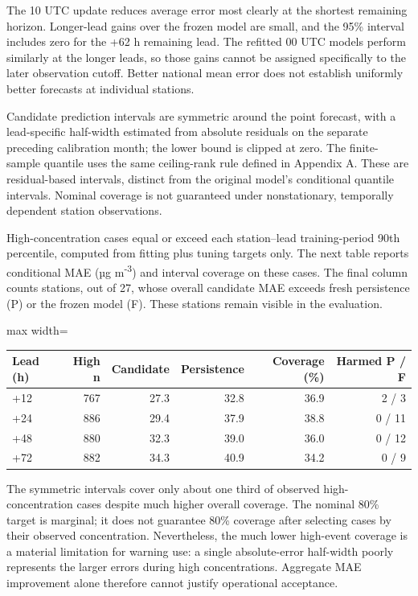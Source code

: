 \documentclass[11pt,a4paper]{article}
\begin{document}
The 10 UTC update reduces average error most clearly at the shortest remaining horizon. Longer-lead gains over the frozen model are small, and the 95\% interval includes zero for the +62 h remaining lead. The refitted 00 UTC models perform similarly at the longer leads, so those gains cannot be assigned specifically to the later observation cutoff. Better national mean error does not establish uniformly better forecasts at individual stations.

Candidate prediction intervals are symmetric around the point forecast, with a lead-specific half-width estimated from absolute residuals on the separate preceding calibration month; the lower bound is clipped at zero. The finite-sample quantile uses the same ceiling-rank rule defined in Appendix A. These are residual-based intervals, distinct from the original model's conditional quantile intervals. Nominal coverage is not guaranteed under nonstationary, temporally dependent station observations.

High-concentration cases equal or exceed each station–lead training-period 90th percentile, computed from fitting plus tuning targets only. The next table reports conditional MAE (µg m\textsuperscript{-3}) and interval coverage on these cases. The final column counts stations, out of 27, whose overall candidate MAE exceeds fresh persistence (P) or the frozen model (F). These stations remain visible in the evaluation.

\begin{table}[H]
\centering
\small
\begin{adjustbox}{max width=\linewidth}
\begin{tabular}{lrrrrr}
\toprule
Lead (h) & High n & Candidate & Persistence & Coverage (\%) & Harmed P / F \\
\midrule
+12 & 767 & 27.3 & 32.8 & 36.9 & 2 / 3 \\
+24 & 886 & 29.4 & 37.9 & 38.8 & 0 / 11 \\
+48 & 880 & 32.3 & 39.0 & 36.0 & 0 / 12 \\
+72 & 882 & 34.3 & 40.9 & 34.2 & 0 / 9 \\
\bottomrule
\end{tabular}
\end{adjustbox}
\end{table}

The symmetric intervals cover only about one third of observed high-concentration cases despite much higher overall coverage. The nominal 80\% target is marginal; it does not guarantee 80\% coverage after selecting cases by their observed concentration. Nevertheless, the much lower high-event coverage is a material limitation for warning use: a single absolute-error half-width poorly represents the larger errors during high concentrations. Aggregate MAE improvement alone therefore cannot justify operational acceptance.
\end{document}
